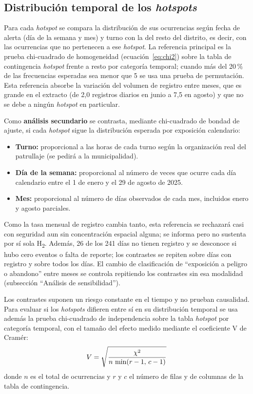 \subsection{Distribución temporal de los \textit{hotspots}}
\label{sec:temporal}

Para cada \textit{hotspot} se compara la distribución de sus ocurrencias según fecha de alerta (día de la semana y mes) y turno con la del resto del distrito, es decir, con las ocurrencias que no pertenecen a ese \textit{hotspot}. La referencia principal es la prueba chi-cuadrado de homogeneidad (ecuación~\ref{eq:chi2}) sobre la tabla de contingencia \textit{hotspot} frente a resto por categoría temporal; cuando más del 20\,\% de las frecuencias esperadas sea menor que 5 se usa una prueba de permutación. Esta referencia absorbe la variación del volumen de registro entre meses, que es grande en el extracto (de 2,0 registros diarios en junio a 7,5 en agosto) y que no se debe a ningún \textit{hotspot} en particular.

Como \textbf{análisis secundario} se contrasta, mediante chi-cuadrado de bondad de ajuste, si cada \textit{hotspot} sigue la distribución esperada por exposición calendario:
\begin{itemize}
    \item \textbf{Turno:} proporcional a las horas de cada turno según la organización real del patrullaje (se pedirá a la municipalidad).
    \item \textbf{Día de la semana:} proporcional al número de veces que ocurre cada día calendario entre el 1 de enero y el 29 de agosto de 2025.
    \item \textbf{Mes:} proporcional al número de días observados de cada mes, incluidos enero y agosto parciales.
\end{itemize}
Como la tasa mensual de registro cambia tanto, esta referencia se rechazará casi con seguridad aun sin concentración espacial alguna; se informa pero no sustenta por sí sola H\textsubscript{2}. Además, 26 de los 241 días no tienen registro y se desconoce si hubo cero eventos o falta de reporte; los contrastes se repiten sobre días con registro y sobre todos los días. El cambio de clasificación de ``exposición a peligro o abandono'' entre meses se controla repitiendo los contrastes sin esa modalidad (subsección ``Análisis de sensibilidad'').

Los contrastes suponen un riesgo constante en el tiempo y no prueban causalidad. Para evaluar si los \textit{hotspots} difieren entre sí en su distribución temporal se usa además la prueba chi-cuadrado de independencia sobre la tabla \textit{hotspot} por categoría temporal, con el tamaño del efecto medido mediante el coeficiente V de Cramér:
\begin{equation}
V = \sqrt{\frac{\chi^{2}}{n\,\min(r-1,\,c-1)}}
\label{eq:cramer}
\eqtitulo{Coeficiente V de Cramér.}
\end{equation}
donde $n$ es el total de ocurrencias y $r$ y $c$ el número de filas y de columnas de la tabla de contingencia.

